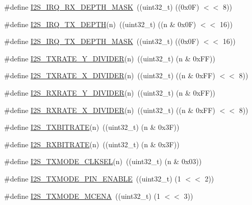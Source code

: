 \begin{DoxyCompactItemize}
\item 
\#define \hyperlink{group__I2S__17XX__40XX_gaeb26d013e12b97b3089bd3666b641cbb}{I2\-S\-\_\-\-I\-R\-Q\-\_\-\-R\-X\-\_\-\-D\-E\-P\-T\-H\-\_\-\-M\-A\-S\-K}~((uint32\-\_\-t) ((0x0\-F) $<$$<$ 8))
\item 
\#define \hyperlink{group__I2S__17XX__40XX_ga115bec3e7413054e340baceb5a066fa7}{I2\-S\-\_\-\-I\-R\-Q\-\_\-\-T\-X\-\_\-\-D\-E\-P\-T\-H}(n)~((uint32\-\_\-t) ((n \& 0x0\-F) $<$$<$ 16))
\item 
\#define \hyperlink{group__I2S__17XX__40XX_gacbd0d516073943ba5aa03e03649e6cc0}{I2\-S\-\_\-\-I\-R\-Q\-\_\-\-T\-X\-\_\-\-D\-E\-P\-T\-H\-\_\-\-M\-A\-S\-K}~((uint32\-\_\-t) ((0x0\-F) $<$$<$ 16))
\item 
\#define \hyperlink{group__I2S__17XX__40XX_ga310a84df35c22ce4bed1f3785145670c}{I2\-S\-\_\-\-T\-X\-R\-A\-T\-E\-\_\-\-Y\-\_\-\-D\-I\-V\-I\-D\-E\-R}(n)~((uint32\-\_\-t) (n \& 0x\-F\-F))
\item 
\#define \hyperlink{group__I2S__17XX__40XX_gab4441c879ba15275e44ffe3f075fecab}{I2\-S\-\_\-\-T\-X\-R\-A\-T\-E\-\_\-\-X\-\_\-\-D\-I\-V\-I\-D\-E\-R}(n)~((uint32\-\_\-t) ((n \& 0x\-F\-F) $<$$<$ 8))
\item 
\#define \hyperlink{group__I2S__17XX__40XX_ga7487e9a82c9bb4a58118038ca6520dbe}{I2\-S\-\_\-\-R\-X\-R\-A\-T\-E\-\_\-\-Y\-\_\-\-D\-I\-V\-I\-D\-E\-R}(n)~((uint32\-\_\-t) (n \& 0x\-F\-F))
\item 
\#define \hyperlink{group__I2S__17XX__40XX_gac6b39adbbfb5ff023160af667debeef6}{I2\-S\-\_\-\-R\-X\-R\-A\-T\-E\-\_\-\-X\-\_\-\-D\-I\-V\-I\-D\-E\-R}(n)~((uint32\-\_\-t) ((n \& 0x\-F\-F) $<$$<$ 8))
\item 
\#define \hyperlink{group__I2S__17XX__40XX_ga12770c3fc9895b7f777bbc9a333485f8}{I2\-S\-\_\-\-T\-X\-B\-I\-T\-R\-A\-T\-E}(n)~((uint32\-\_\-t) (n \& 0x3\-F))
\item 
\#define \hyperlink{group__I2S__17XX__40XX_ga3bd379e9dd707c7304c0e74525ed5e72}{I2\-S\-\_\-\-R\-X\-B\-I\-T\-R\-A\-T\-E}(n)~((uint32\-\_\-t) (n \& 0x3\-F))
\item 
\#define \hyperlink{group__I2S__17XX__40XX_ga34a82caff9de404af31e19e86ebaa193}{I2\-S\-\_\-\-T\-X\-M\-O\-D\-E\-\_\-\-C\-L\-K\-S\-E\-L}(n)~((uint32\-\_\-t) (n \& 0x03))
\item 
\#define \hyperlink{group__I2S__17XX__40XX_ga3e268d07b159ec36998eb32a9e36af69}{I2\-S\-\_\-\-T\-X\-M\-O\-D\-E\-\_\-P\-I\-N\-\_\-\-E\-N\-A\-B\-L\-E}~((uint32\-\_\-t) (1 $<$$<$ 2))
\item 
\#define \hyperlink{group__I2S__17XX__40XX_gabd67f37d51f2557f49fa600abb48225b}{I2\-S\-\_\-\-T\-X\-M\-O\-D\-E\-\_\-\-M\-C\-E\-N\-A}~((uint32\-\_\-t) (1 $<$$<$ 3))
$$
\end{DoxyCompactItemize}
